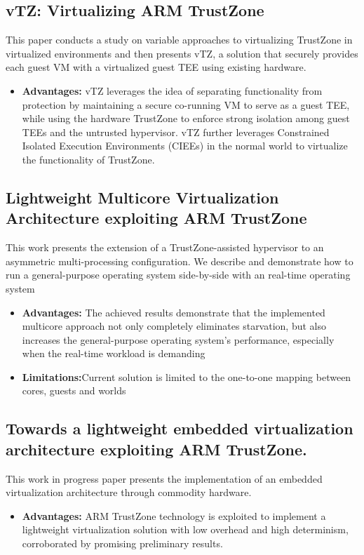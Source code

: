 \documentclass[conference]{IEEEtran}
\begin{document}
\subsection{vTZ: Virtualizing ARM TrustZone}
This paper conducts a study on variable approaches to virtualizing TrustZone in virtualized environments and then presents vTZ, a solution that securely provides each guest VM with a virtualized guest TEE using existing hardware.
\begin{itemize}
    \item \textbf{Advantages:} vTZ leverages the idea of separating functionality from protection by maintaining a secure co-running VM to serve as a guest TEE, while using the hardware TrustZone to enforce strong isolation among guest TEEs and the untrusted hypervisor. vTZ further leverages Constrained Isolated Execution Environments (CIEEs) in the normal world to virtualize the functionality of TrustZone.
\end{itemize}


\subsection{Lightweight Multicore Virtualization Architecture exploiting ARM TrustZone}
This work presents the extension of a TrustZone-assisted hypervisor to an asymmetric multi-processing configuration. We describe and demonstrate how to run a general-purpose operating system side-by-side with an real-time operating system
\begin{itemize}
    \item \textbf{Advantages:} The achieved results demonstrate that the implemented multicore approach not only completely eliminates starvation, but also increases the general-purpose operating system’s performance, especially when the real-time workload is demanding
    \item \textbf{Limitations:}Current solution is limited to the one-to-one mapping between cores, guests and worlds
\end{itemize}


\subsection{Towards a lightweight embedded virtualization architecture exploiting ARM TrustZone.}
This work in progress paper presents the implementation of an embedded virtualization architecture through commodity hardware.
\begin{itemize}
    \item \textbf{Advantages:} ARM TrustZone technology is exploited to implement a lightweight virtualization solution with low overhead and high determinism, corroborated by promising preliminary results.
\end{itemize}
\end{document}

